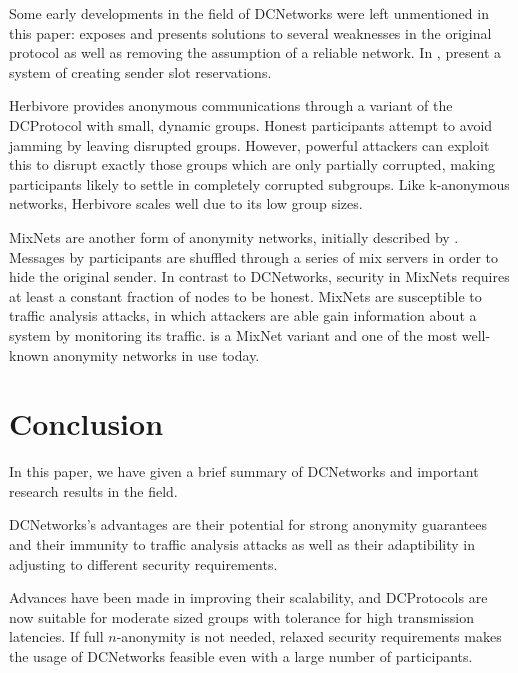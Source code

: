 Some early developments in the field of \acp{DCNetwork} were left unmentioned in this paper:
\cite{waidner1989dining} exposes and presents solutions to several weaknesses in the
original protocol as well as removing the assumption
of a reliable network. In \cite{bos1990detection}, \citeauthor{bos1990detection} present a system of creating sender slot reservations.

Herbivore \cite{goel2003herbivore} provides anonymous communications through a variant of the
\ac{DCProtocol} with small, dynamic groups. Honest participants attempt to avoid jamming by
leaving disrupted groups. However, powerful attackers can exploit this to disrupt exactly those groups
which are only partially corrupted, making participants likely to settle in completely corrupted subgroups.
Like k-anonymous networks, Herbivore scales well due to its low group sizes.

\acp{MixNet} are another form of anonymity networks, initially described by \citeauthor{journals/cacm/Chaum81}
\cite{journals/cacm/Chaum81}. Messages by participants are shuffled through a series of mix servers
in order to hide the original sender. In contrast to \acp{DCNetwork}, security in \acp{MixNet} requires
at least a constant fraction of nodes to be honest. \acp{MixNet} are susceptible to traffic analysis attacks,
in which attackers are able gain information about a system by monitoring its traffic.
\Tor \cite{conf/uss/DingledineMS04} is a \ac{MixNet} variant and one of the most well-known anonymity networks
in use today.

\enlargethispage{-.9in}

\section{Conclusion}

In this paper, we have given a brief summary of \acp{DCNetwork} and important
research results in the field.

\acp{DCNetwork}'s advantages are their potential for strong anonymity guarantees
and their immunity to traffic analysis attacks as well as their adaptibility in 
adjusting to different security requirements.

Advances have been made in improving their scalability, and \acp{DCProtocol} 
are now suitable for moderate sized groups with tolerance for high
transmission latencies. If full $n$-anonymity is not needed, relaxed
security requirements makes the usage of \acp{DCNetwork} feasible even with
a large number of participants.

